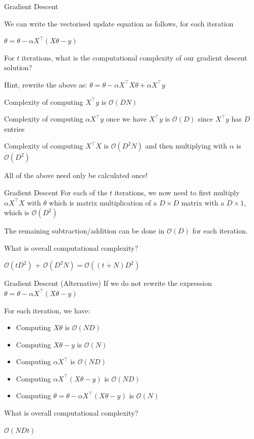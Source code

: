 \documentclass[usenames,dvipsnames]{beamer}
\begin{document}
\begin{frame}{Gradient Descent}


We can write the vectorised update equation as follows, for each iteration

\(\theta=\theta - \alpha X^{\top}(X \theta-y)\) 


\pause For $t$ iterations, what is the computational complexity of our gradient descent solution?

\pause Hint, rewrite the above as: \(\theta=\theta - \alpha X^{\top}X \theta+ \alpha X^{\top}y\) 

\pause Complexity of computing $X^{\top}y$ is $\mathcal{O}(DN)$

\pause Complexity of computing $\alpha X^{\top}y$ once we have $X^{\top}y$ is $\mathcal{O}(D)$ since  $X^{\top}y$ has $D$ entries

\pause Complexity of computing $X^{\top}X$ is $\mathcal{O}(D^2N)$ and then multiplying with $\alpha$ is  $\mathcal{O}(D^2)$

\pause All of the above need only be calculated once!



\end{frame}



\begin{frame}{Gradient Descent}
\pause For each of the $t$ iterations, we now need to first multiply  $\alpha X^{\top}X$ with $\theta$ which is matrix multiplication of a $D \times D$ matrix with a $D \times 1$, which is $\mathcal{O}(D^2)$ 

\pause The remaining subtraction/addition can be done in $\mathcal{O}(D)$ for each iteration.

\pause What is overall computational complexity?

\pause $\mathcal{O}(tD^2)$ + $\mathcal{O}(D^2N) = \mathcal{O}((t+N)D^2)$
\end{frame}

\begin{frame}{Gradient Descent (Alternative)}
\pause If we do not rewrite the expression
\(\theta=\theta - \alpha X^{\top}(X \theta-y)\) 

For each iteration, we have:
\begin{itemize}[<+->]
	\item Computing $X\theta$ is $\mathcal{O}(ND)$
	\item Computing $X\theta - y$ is $\mathcal{O}(N)$
	\item Computing $\alpha X^{\top}$ is $\mathcal{O}(ND)$
	\item Computing $\alpha X^{\top}(X\theta - y)$ is $\mathcal{O}(ND)$
	\item Computing \(\theta=\theta - \alpha X^{\top}(X \theta-y)\) is $\mathcal{O}(N)$
\end{itemize}

\pause What is overall computational complexity?

\pause $\mathcal{O}(NDt)$
\end{frame}

 
\end{document}
